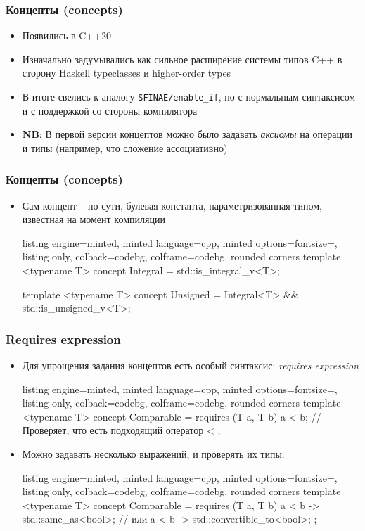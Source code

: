 \documentclass[10pt]{beamer}
\begin{document}
\begin{frame}[fragile]
\frametitle{Концепты (concepts)}
\begin{itemize}
\item Появились в C++20
\pause
\item Изначально задумывались как сильное расширение системы типов C++ в сторону Haskell typeclasses и higher-order types
\pause
\item В итоге свелись к аналогу \texttt{SFINAE/enable\_if}, но с нормальным синтаксисом и с поддержкой со стороны компилятора
\pause
\item \textbf{NB}: В первой версии концептов можно было задавать \textit{аксиомы} на операции и типы (например, что сложение ассоциативно)
\end{itemize}
\end{frame}

\begin{frame}[fragile]
\frametitle{Концепты (concepts)}
\begin{itemize}
\item Сам концепт -- по сути, булевая константа, параметризованная типом, известная на момент компиляции
\pause
{}
\begin{tcblisting}{listing engine=minted, minted language=cpp, minted options={fontsize=\scriptsize}, listing only, colback=codebg, colframe=codebg, rounded corners}
template <typename T>
concept Integral = std::is_integral_v<T>;

template <typename T>
concept Unsigned = Integral<T> && std::is_unsigned_v<T>;
\end{tcblisting}
\end{itemize}
\end{frame}

\begin{frame}[fragile]
\frametitle{Requires expression}
\begin{itemize}
\item Для упрощения задания концептов есть особый синтаксис: \textit{requires expression}
\pause
{}
\begin{tcblisting}{listing engine=minted, minted language=cpp, minted options={fontsize=\scriptsize}, listing only, colback=codebg, colframe=codebg, rounded corners}
template <typename T>
concept Comparable = requires (T a, T b) {
  a < b; // Проверяет, что есть подходящий оператор <
};
\end{tcblisting}
\pause
\item Можно задавать несколько выражений, и проверять их типы:
\begin{tcblisting}{listing engine=minted, minted language=cpp, minted options={fontsize=\scriptsize}, listing only, colback=codebg, colframe=codebg, rounded corners}
template <typename T>
concept Comparable = requires (T a, T b) {
  { a < b } -> std::same_as<bool>;
  // или
  { a < b } -> std::convertible_to<bool>;
};
\end{tcblisting}
\end{itemize}
\end{frame}
\end{document}
